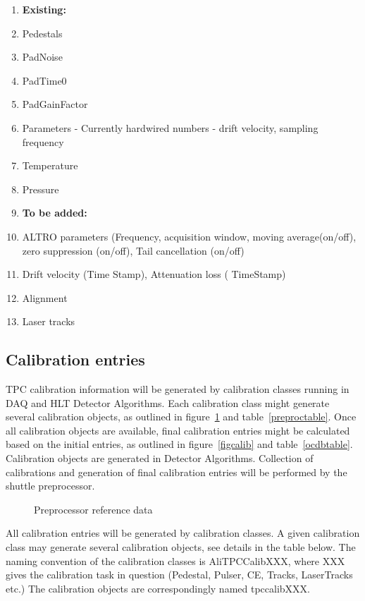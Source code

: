 \documentclass[a4paper,12pt]{article}
\begin{document}
\begin{enumerate}
\item[] \textbf{Existing:}  
  \item Pedestals 
  \item PadNoise
  \item PadTime0 
  \item PadGainFactor      
  \item Parameters - Currently hardwired numbers - drift velocity, sampling frequency
  \item Temperature
  \item Pressure

\item[] \textbf {To be added:}
  \item ALTRO parameters (Frequency, acquisition window, moving average(on/off), zero suppression (on/off), Tail cancellation (on/off)
  \item Drift velocity (Time Stamp),  Attenuation loss  ( TimeStamp)
  \item Alignment
  \item Laser tracks  
\end{enumerate}

\subsection{Calibration entries}

TPC calibration information will be generated by calibration classes running in
DAQ and HLT Detector Algorithms. Each calibration class might generate several
calibration objects, as outlined in figure~\ref{figreference} and
table~\ref{preproctable}. Once all calibration
objects are available, final calibration entries might be calculated based on
the initial entries, as outlined in figure~\ref{figcalib} and table~\ref{ocdbtable}. Calibration objects 
are generated in Detector Algorithms. Collection of calibrations and generation 
of final calibration entries will be performed by the shuttle preprocessor.

\begin{figure}
  \centering{}
  \caption{Preprocessor reference data}
  \label{figreference}
\end{figure}


All calibration entries will be generated by calibration classes. A given
calibration class may generate several calibration objects, see details in the 
table below. The naming convention of the calibration classes is AliTPCCalibXXX,
where XXX gives the calibration task in question (Pedestal, Pulser, CE, Tracks,
LaserTracks etc.) The calibration objects are correspondingly named tpccalibXXX.
\end{document}
